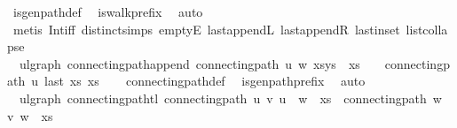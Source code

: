 \begin{isabellebody}
\ is{\isacharunderscore}{\kern0pt}gen{\isacharunderscore}{\kern0pt}path{\isacharunderscore}{\kern0pt}def\ \isamarkupfalse%
\ is{\isacharunderscore}{\kern0pt}walk{\isacharunderscore}{\kern0pt}prefix\ \isamarkupfalse%
\ auto\isanewline
\ \ \isamarkupfalse%
\ {\isacharparenleft}{\kern0pt}metis\ Int{\isacharunderscore}{\kern0pt}iff\ distinct{\isachardot}{\kern0pt}simps{\isacharparenleft}{\kern0pt}{}{\isacharparenright}{\kern0pt}\ emptyE\ last{\isacharunderscore}{\kern0pt}appendL\ last{\isacharunderscore}{\kern0pt}appendR\ last{\isacharunderscore}{\kern0pt}in{\isacharunderscore}{\kern0pt}set\ list{\isachardot}{\kern0pt}collapse{\isacharparenright}{\kern0pt}%
\endisatagproof
{\isafoldproof}%
%
\isadelimproof
\isanewline
%
\endisadelimproof
\isanewline
{}\isamarkupfalse%
\ {\isacharparenleft}{\kern0pt}\ ulgraph{\isacharparenright}{\kern0pt}\ connecting{\isacharunderscore}{\kern0pt}path{\isacharunderscore}{\kern0pt}append{\isacharcolon}{\kern0pt}\ {\isachardoublequoteopen}connecting{\isacharunderscore}{\kern0pt}path\ u\ w\ {\isacharparenleft}{\kern0pt}xs{\isacharat}{\kern0pt}ys{\isacharparenright}{\kern0pt}\ {\isasymLongrightarrow}\ xs\ {\isasymnoteq}\ {\isacharbrackleft}{\kern0pt}{\isacharbrackright}{\kern0pt}\ {\isasymLongrightarrow}\ connecting{\isacharunderscore}{\kern0pt}path\ u\ {\isacharparenleft}{\kern0pt}last\ xs{\isacharparenright}{\kern0pt}\ xs{\isachardoublequoteclose}\isanewline
%
\isadelimproof
\ \ %
\endisadelimproof
%
\isatagproof
{}\isamarkupfalse%
\ connecting{\isacharunderscore}{\kern0pt}path{\isacharunderscore}{\kern0pt}def\ \isamarkupfalse%
\ is{\isacharunderscore}{\kern0pt}gen{\isacharunderscore}{\kern0pt}path{\isacharunderscore}{\kern0pt}prefix\ \isamarkupfalse%
\ auto%
\endisatagproof
{\isafoldproof}%
%
\isadelimproof
\isanewline
%
\endisadelimproof
\isanewline
{}\isamarkupfalse%
\ {\isacharparenleft}{\kern0pt}\ ulgraph{\isacharparenright}{\kern0pt}\ connecting{\isacharunderscore}{\kern0pt}path{\isacharunderscore}{\kern0pt}tl{\isacharcolon}{\kern0pt}\ {\isachardoublequoteopen}connecting{\isacharunderscore}{\kern0pt}path\ u\ v\ {\isacharparenleft}{\kern0pt}u\ {\isacharhash}{\kern0pt}\ w\ {\isacharhash}{\kern0pt}\ xs{\isacharparenright}{\kern0pt}\ {\isasymLongrightarrow}\ connecting{\isacharunderscore}{\kern0pt}path\ w\ v\ {\isacharparenleft}{\kern0pt}w\ {\isacharhash}{\kern0pt}\ xs{\isacharparenright}{\kern0pt}{\isachardoublequoteclose}\isanewline
%
\isadelimproof

\end{isabellebody}

